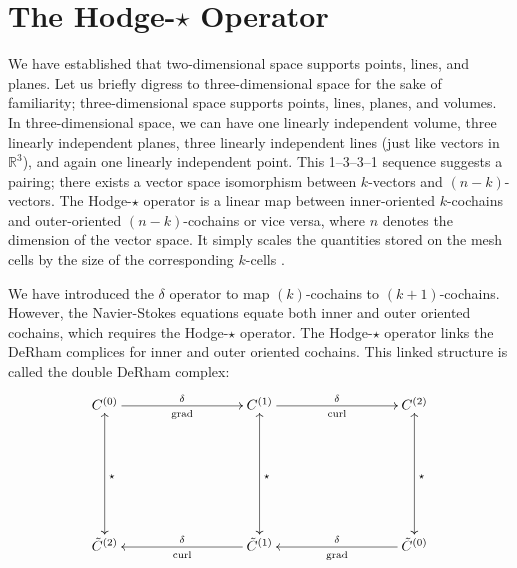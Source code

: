 \section{The Hodge-$\star$ Operator}

We have established that two-dimensional space supports points, lines, and planes. Let us briefly digress to three-dimensional space for the sake of familiarity; three-dimensional space supports points, lines, planes, and volumes. In three-dimensional space, we can have one linearly independent volume, three linearly independent planes, three linearly independent lines (just like vectors in $\mathbb{R}^3$), and again one linearly independent point. This 1--3--3--1 sequence suggests a pairing; there exists a vector space isomorphism between $k$-vectors and $(n-k)$-vectors. The Hodge-$\star$ operator is a linear map between inner-oriented $k$-cochains and outer-oriented $(n-k)$-cochains or vice versa, where $n$ denotes the dimension of the vector space. It simply scales the quantities stored on the mesh cells by the size of the corresponding $k$-cells \parencite{elcott2005discrete}.

We have introduced the $\delta$ operator to map $(k)$-cochains to $(k+1)$-cochains. However, the Navier-Stokes equations equate both inner and outer oriented cochains, which requires the Hodge-$\star$ operator. The Hodge-$\star$ operator links the DeRham complices for inner and outer oriented cochains. This linked structure is called the double DeRham complex:
\begin{equation}
    \begin{gathered}
        \xymatrix@=20ex{
            C^{(0)} \ar[r]^{\delta}_{\text{grad}} \ar@{<->}[d]^{\star} & C^{(1)} \ar[r]^{\delta}_{\text{curl}} \ar@{<->}[d]^{\star} & C^{(2)} \ar@{<->}[d]^{\star} \\
            \tilde{C}^{(2)} & \tilde{C}^{(1)} \ar[l]_{\delta}^{\text{curl}} & \tilde{C}^{(0)} \ar[l]_{\delta}^{\text{grad}}
        }
    \end{gathered}
    \label{eq:doubleDeRham}
\end{equation}

